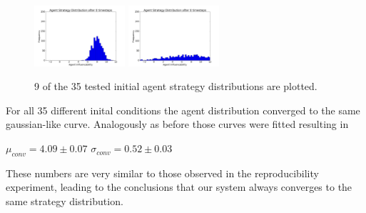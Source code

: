 \documentclass[11pt]{article}
\begin{document}
\begin{figure}
  \includegraphics[width=0.3\textwidth]{figures/ic8.png}
  \includegraphics[width=0.3\textwidth]{figures/ic9.png}
  \caption[Different Initial Conditions]{9 of the 35 tested initial agent strategy distributions are plotted.}
  \label{fig:initialconditions}
\end{figure}
For all 35 different inital conditions the agent distribution converged to the same gaussian-like curve. Analogously as before those curves were fitted resulting in
\begin{center}
  $\mu_{conv} = 4.09\pm 0.07$
  $\sigma_{conv} = 0.52\pm 0.03$
\end{center}
These numbers are very similar to those observed in the reproducibility experiment, leading to the conclusions that our system always converges to the same strategy distribution.
\end{document}
